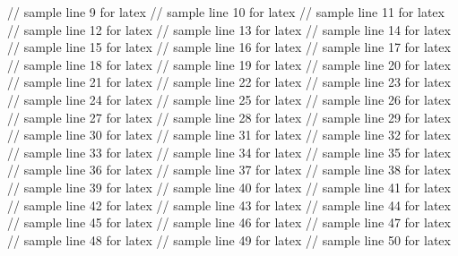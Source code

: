// sample line 9 for latex
// sample line 10 for latex
// sample line 11 for latex
// sample line 12 for latex
// sample line 13 for latex
// sample line 14 for latex
// sample line 15 for latex
// sample line 16 for latex
// sample line 17 for latex
// sample line 18 for latex
// sample line 19 for latex
// sample line 20 for latex
// sample line 21 for latex
// sample line 22 for latex
// sample line 23 for latex
// sample line 24 for latex
// sample line 25 for latex
// sample line 26 for latex
// sample line 27 for latex
// sample line 28 for latex
// sample line 29 for latex
// sample line 30 for latex
// sample line 31 for latex
// sample line 32 for latex
// sample line 33 for latex
// sample line 34 for latex
// sample line 35 for latex
// sample line 36 for latex
// sample line 37 for latex
// sample line 38 for latex
// sample line 39 for latex
// sample line 40 for latex
// sample line 41 for latex
// sample line 42 for latex
// sample line 43 for latex
// sample line 44 for latex
// sample line 45 for latex
// sample line 46 for latex
// sample line 47 for latex
// sample line 48 for latex
// sample line 49 for latex
// sample line 50 for latex
